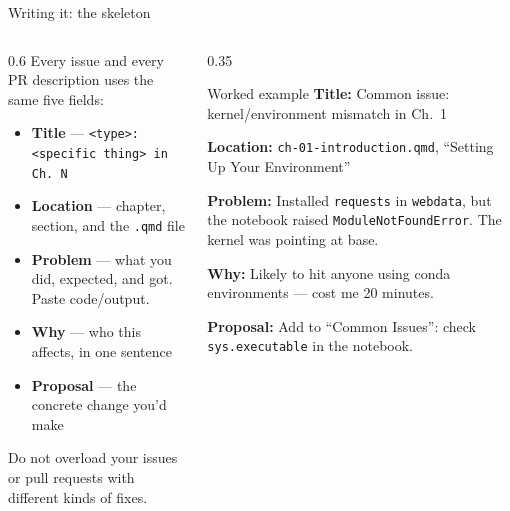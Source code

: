 \documentclass[9pt,aspectratio=169]{beamer}
\begin{document}
\begin{frame}{Writing it: the skeleton}
    \begin{columns}[T]
        \begin{column}{0.6\textwidth}
            Every issue and every PR description uses the same five fields:

            \medskip

            \begin{itemize}\small
                \item \textbf{Title} --- \texttt{<type>: <specific thing> in Ch. N}
                \item \textbf{Location} --- chapter, section, and the \texttt{.qmd} file
                \item \textbf{Problem} --- what you did, expected, and got. Paste code/output.
                \item \textbf{Why} --- who this affects, in one sentence
                \item \textbf{Proposal} --- the concrete change you'd make
            \end{itemize}

            Do not overload your issues or pull requests with different kinds of fixes.
        \end{column}
        \begin{column}{0.35\textwidth}
            \begin{block}{Worked example}
                \footnotesize
                \textbf{Title:} Common issue: kernel/environment mismatch in Ch.~1
                \smallskip

                \textbf{Location:} \texttt{ch-01-introduction.qmd}, ``Setting Up Your Environment''
                \smallskip

                \textbf{Problem:} Installed \texttt{requests} in \texttt{webdata}, but the notebook raised \texttt{ModuleNotFoundError}. The kernel was pointing at base.
                \smallskip

                \textbf{Why:} Likely to hit anyone using conda environments --- cost me 20 minutes.
                \smallskip

                \textbf{Proposal:} Add to ``Common Issues'': check \texttt{sys.executable} in the notebook.
            \end{block}
        \end{column}
    \end{columns}
\end{frame}
\end{document}
